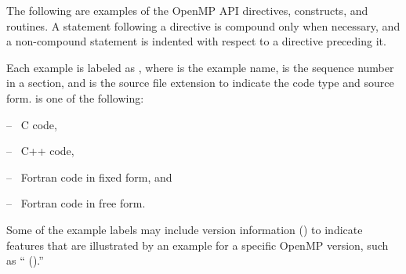 \label{chap:examples}

The following are examples of the OpenMP API directives, constructs, and routines.
\ccppspecificstart
A statement following a directive is compound only when necessary, and a 
non-compound statement is indented with respect to a directive preceding it.
\ccppspecificend

Each example is labeled as , where  is 
the example name,  is the sequence number in a section, and 
 is the source file extension to indicate the code type and 
source form.   is one of the following:
\begin{description}[noitemsep,labelindent=5mm,widest=f90]
\item[\plc{c}] -- \ C code,
\item[\plc{cpp}] -- \ C++ code,
\item[\plc{f}] -- \ Fortran code in fixed form, and
\item[\plc{f90}] -- \ Fortran code in free form.
\end{description}

Some of the example labels may include version information 
() to indicate features that are illustrated
by an example for a specific OpenMP version, such as `` 
\;().''
